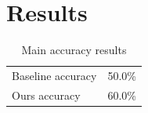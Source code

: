 \documentclass{article}
\begin{document}
\begin{abstract}
Our method improves accuracy from 50.0\% to 60.0\%, a 20.0\% relative improvement.
\end{abstract}
\section{Results}
\begin{table}
\caption{Main accuracy results}
\begin{tabular}{lr}
Baseline accuracy & 50.0\% \\
Ours accuracy & 60.0\% \\
\end{tabular}
\end{table}
\end{document}
